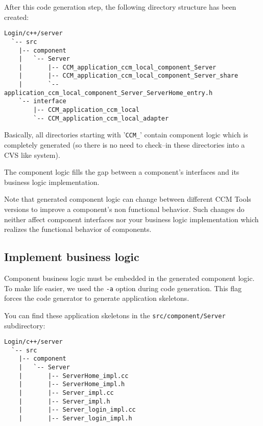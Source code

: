 After this code generation step, the following directory structure has been created:
\begin{verbatim}
Login/c++/server
  `-- src
    |-- component
    |   `-- Server
    |       |-- CCM_application_ccm_local_component_Server
    |       |-- CCM_application_ccm_local_component_Server_share
    |       `-- application_ccm_local_component_Server_ServerHome_entry.h
    `-- interface
        |-- CCM_application_ccm_local
        `-- CCM_application_ccm_local_adapter
\end{verbatim}

Basically, all directories starting with '{\tt CCM\_}' contain component logic
which is completely generated (so there is no need to check--in these directories
into a CVS like system).

\vspace{3mm}
The component logic fills the gap between a component's interfaces and its
business logic implementation. 

\vspace{3mm}
Note that generated component logic can change between different CCM Tools
versions to improve a component's non functional behavior. Such changes do neither
affect component interfaces nor your business logic implementation which
realizes the functional behavior of components.   


\subsection{Implement business logic}
\label{subsection:ImplementC++BusinessLogic}

Component business logic must be embedded in the generated component logic.
To make life easier, we used the {\tt -a} option during code generation.
This flag forces the code generator to generate application skeletons.

\vspace{3mm}
You can find these application skeletons in the {\tt src/component/Server}
subdirectory:

\begin{verbatim}
Login/c++/server
  `-- src
    |-- component
    |   `-- Server
    |       |-- ServerHome_impl.cc
    |       |-- ServerHome_impl.h
    |       |-- Server_impl.cc
    |       |-- Server_impl.h
    |       |-- Server_login_impl.cc
    |       |-- Server_login_impl.h
\end{verbatim}

